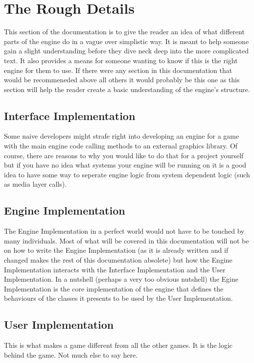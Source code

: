 \documentclass[12pt]{article}
\begin{document}
\section{The Rough Details}
This section of the documentation is to give the reader an idea of what different parts of the engine do in a vague over simplistic way. It is meant to help someone gain a slight understanding before they dive neck deep into the more complicated text. It also provides a means for someone wanting to know if this is the right engine for them to use. If there were any section in this documentation that would be recommeneded above all others it would probably be this one as this section will help the reader create a basic understanding of the engine's structure.

\subsection{Interface Implementation}
Some naive developers might strafe right into developing an engine for a game with the main engine code calling methods to an external graphics library. Of course, there are reasons to why you would like to do that for a project yourself but if you have no idea what systems your engine will be running on it is a good idea to have some way to seperate engine logic from system dependent logic (such as media layer calls).

\subsection{Engine Implementation}
The Engine Implementation in a perfect world would not have to be touched by many individuals. Most of what will be covered in this documentation will not be on how to write the Engine Implementation (as it is already written and if changed makes the rest of this documentation absolete) but how the Engine Implementation interacts with the Interface Implementation and the User Implementation. In a nutshell (perhaps a very too obvious nutshell) the Egine Implementation is the core implementation of the engine that defines the behaviours of the classes it presents to be used by the User Implementation.

\subsection{User Implementation}
This is what makes a game different from all the other games. It is the logic behind the game. Not much else to say here.
\end{document}
